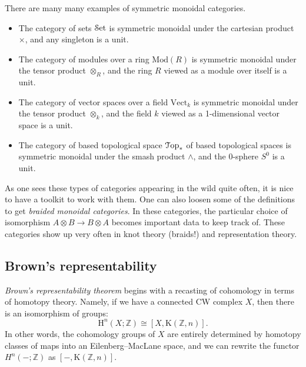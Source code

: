 \documentclass[10pt]{amsart}
\newcommand{\euscr}[1]{\EuScript{#1}}
\theoremstyle{definition}
\newcommand{\cdef}[1]{\textcolor{Bittersweet}{#1}}
\begin{document}
There are many many examples of symmetric monoidal categories.
\begin{itemize}
    \item The category of sets $\euscr{S}\mathrm{et}$ is symmetric monoidal under the cartesian product $\times$, and any singleton is a unit.
    \item The category of modules over a ring $\text{Mod}(R)$ is symmetric monoidal under the tensor product $\otimes_R$, and the ring $R$ viewed as a module over itself is a unit.
    \item The category of vector spaces over a field $\text{Vect}_k$ is symmetric monoidal under the tensor product $\otimes_k$, and the field $k$ viewed as a 1-dimensional vector space is a unit.
    \item The category of based topological space $\euscr{T}\mathrm{op}_*$ of based topological spaces is symmetric monoidal under the smash product $\wedge$, and the 0-sphere $S^0$ is a unit.
\end{itemize}

As one sees these types of categories appearing in the wild quite often, it is nice to have a toolkit to work with them. One can also loosen some of the definitions to get \cdef{\emph{braided monoidal categories}}. In these categories, the particular choice of isomorphism $A \otimes B \to B \otimes A$ becomes important data to keep track of. These categories show up very often in knot theory (braids!) and representation theory.




\subsection*{Brown's representability}
\cdef{\emph{Brown's representability theorem}} begins with a recasting of cohomology in terms of homotopy theory. Namely, if we have a connected CW complex $X$, then there is an isomorphism of groups:
\[
\text{H}^n(X; \mathbb{Z}) \cong [X, \text{K}(\mathbb{Z}, n)].
\]
In other words, the cohomology groups of $X$ are entirely determined by homotopy classes of maps into an Eilenberg--MacLane space, and we can rewrite the functor $H^n(-; \mathbb{Z})$ as $[-, \text{K}(\mathbb{Z}, n)]$.
\end{document}
